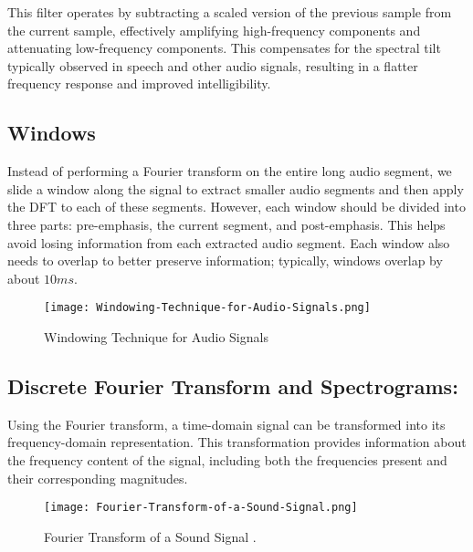 This filter operates by subtracting a scaled version of the
previous sample from the current sample, effectively
amplifying high-frequency components and attenuating
low-frequency components. This compensates for the spectral
tilt typically observed in speech and other audio signals,
resulting in a flatter frequency response and improved
intelligibility.

\subsection{Windows}

Instead of performing a Fourier transform on the entire long
audio segment, we slide a window along the signal to extract
smaller audio segments and then apply the DFT to each of these
segments. However, each window should be divided into three
parts: pre-emphasis, the current segment, and post-emphasis.
This helps avoid losing information from each extracted audio
segment. Each window also needs to overlap to better preserve
information; typically, windows overlap by about $10ms$.

\vspace{-1em}
\begin{figure}[H]
    \centering
    \texttt{[image: Windowing-Technique-for-Audio-Signals.png]}
    \caption{Windowing Technique for Audio Signals}
    \label{fig:windowing-technique-for-audio-signals}
\end{figure}
\vspace{-1em}

\subsection{Discrete Fourier Transform and Spectrograms:}

Using the Fourier transform, a time-domain signal can be
transformed into its frequency-domain representation. This
transformation provides information about the frequency
content of the signal, including both the frequencies present
and their corresponding magnitudes.

\vspace{-1em}
\begin{figure}[H]
    \centering
    \texttt{[image: Fourier-Transform-of-a-Sound-Signal.png]}
    \caption{Fourier Transform of a Sound Signal \cite{technical_editor_2017}.}
    \label{fig:fourier-transform-of-a-sound-signal}
\end{figure}
\vspace{-1em}

